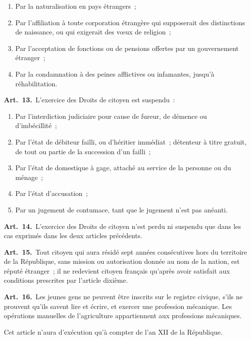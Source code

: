 \documentclass[french,twoside]{book} %
\newcommand{\labelchar}[1]{\textbf{\color{rubric} #1}}
\begin{document}
\begin{enumerate}[itemsep=0pt,topsep=0pt,partopsep=0pt,parskip=0pt]
\item Par la naturalisation en pays étrangers ;
\item Par l’affiliation à toute corporation étrangère qui supposerait des distinctions de naissance, ou qui exigerait des vœux de religion ;
\item Par l’acceptation de fonctions ou de pensions offertes par un gouvernement étranger ;
\item Par la condamnation à des peines afflictives ou infamantes, jusqu’à réhabilitation.
\end{enumerate}

\labelchar{Art. 13.} L’exercice des Droits de citoyen est suspendu :\par

\begin{enumerate}[itemsep=0pt,topsep=0pt,partopsep=0pt,parskip=0pt]
\item Par l’interdiction judiciaire pour cause de fureur, de démence ou d’imbécillité ;
\item Par l’état de débiteur failli, ou d’héritier immédiat ; détenteur à titre gratuit, de tout ou partie de la succession d’un failli ;
\item Par l’état de domestique à gage, attaché au service de la personne ou du ménage ;
\item Par l’état d’accusation ;
\item Par un jugement de contumace, tant que le jugement n’est pas anéanti.
\end{enumerate}

\labelchar{Art. 14.} L’exercice des Droits de citoyen n’est perdu ni suspendu que dans les cas exprimés dans les deux articles précédents.\par
\labelchar{Art. 15.} Tout citoyen qui aura résidé sept années consécutives hors du territoire de la République, sans mission ou autorisation donnée au nom de la nation, est réputé étranger ; il ne redevient citoyen français qu’après avoir satisfait aux conditions prescrites par l’article dixième.\par
\labelchar{Art. 16.} Les jeunes gens ne peuvent être inscrits sur le registre civique, s’ils ne prouvent qu’ils savent lire et écrire, et exercer une profession mécanique. Les opérations manuelles de l’agriculture appartiennent aux professions mécaniques.\par
Cet article n’aura d’exécution qu’à compter de l’an XII de la République.
\end{document}

